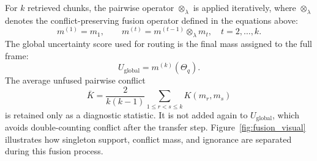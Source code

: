 \documentclass[preprint,12pt,authoryear,nopreprintline]{elsarticle}
\newcommand{\Frame}{\Theta}
\begin{document}
For $k$ retrieved chunks, the pairwise operator $\otimes_{\lambda}$ is applied iteratively, where $\otimes_{\lambda}$ denotes the conflict-preserving fusion operator defined in the equations above:
\begin{equation}
    m^{(1)}=m_1, \qquad m^{(t)}=m^{(t-1)}\otimes_{\lambda} m_t, \quad t=2,\ldots,k.
    \label{eq:iter_fusion}
\end{equation}
The global uncertainty score used for routing is the final mass assigned to the full frame:
\begin{equation}
    U_{\mathrm{global}}=m^{(k)}(\Frame_q).
    \label{eq:global_uncertainty}
\end{equation}
The average unfused pairwise conflict
\begin{equation}
    \bar{K}=\frac{2}{k(k-1)}\sum_{1\leq r<s\leq k}K(m_r,m_s)
    \label{eq:pairwise_conflict_diagnostic}
\end{equation}
is retained only as a diagnostic statistic. It is not added again to $U_{\mathrm{global}}$, which avoids double-counting conflict after the transfer step. Figure~\ref{fig:fusion_visual} illustrates how singleton support, conflict mass, and ignorance are separated during this fusion process.
\end{document}
